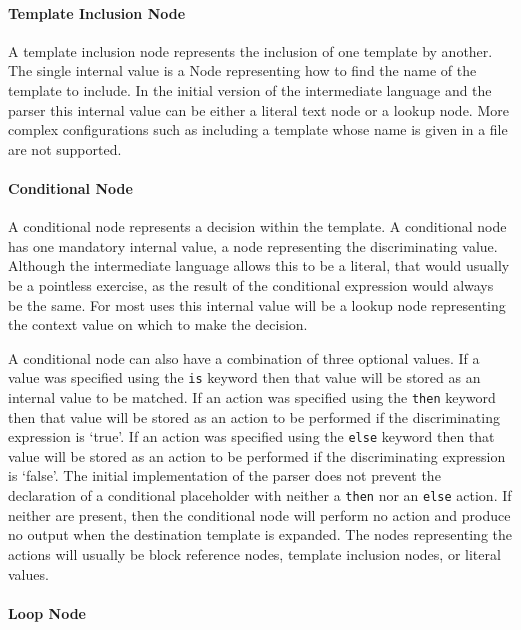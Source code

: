 \paragraph{Template Inclusion Node}

A template inclusion node represents the inclusion of one template by another. The single internal value is a Node representing how to find the name of the template to include. In the initial version of the intermediate language and the parser this internal value can be either a literal text node or a lookup node. More complex configurations such as including a template whose name is given in a file are not supported.

\paragraph{Conditional Node}

A conditional node represents a decision within the template. A conditional node has one mandatory internal value, a node representing the discriminating value. Although the intermediate language allows this to be a literal, that would usually be a pointless exercise, as the result of the conditional expression would always be the same. For most uses this internal value will be a lookup node representing the context value on which to make the decision.

A conditional node can also have a combination of three optional values. If a value was specified using the \verb!is! keyword then that value will be stored as an internal value to be matched. If an action was specified using the \verb!then! keyword then that value will be stored as an action to be performed if the discriminating expression is `true'. If an action was specified using the \verb!else! keyword then that value will be stored as an action to be performed if the discriminating expression is `false'. The initial implementation of the parser does not prevent the declaration of a conditional placeholder with neither a \verb!then! nor an \verb!else! action. If neither are present, then the conditional node will perform no action and produce no output when the destination template is expanded. The nodes representing the actions will usually be block reference nodes, template inclusion nodes, or literal values.

\paragraph{Loop Node}

